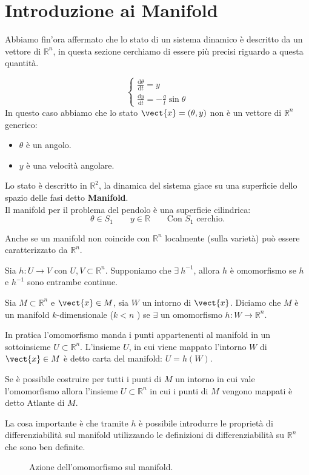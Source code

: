 \section{Introduzione ai Manifold}%
\label{sub:Introduzione ai Manifold}
Abbiamo fin'ora affermato che lo stato di un sistema dinamico è descritto da un vettore di $\mathbb{R}^n$, in questa sezione cerchiamo di essere più precisi riguardo a questa quantità.
\begin{exmp}
    \[
        \begin{cases}
            \frac{\text{d} \theta}{\text{d} t} = y\\
	    \frac{\text{d} y}{\text{d} t} = -\frac{g}{l}\sin\theta
        \end{cases}
    \] 
    In questo caso abbiamo che lo stato $\vect{x} = (\theta, y)$ non è un vettore di $\mathbb{R}^n$ generico: 
    \begin{itemize}
        \item $\theta$ è un angolo. 
	\item $y$ è una velocità angolare.
    \end{itemize}
    Lo stato è descritto in $\mathbb{R}^2$, la dinamica del sistema giace su una superficie dello spazio delle fasi detto \textbf{Manifold}.\\
    Il manifold per il problema del pendolo è una superficie cilindrica:
    \[
        \theta\in S_1 \qquad y \in \mathbb{R}\qquad \text{Con $S_1$ cerchio}
    .\] 
\end{exmp}
\noindent
Anche se un manifold non coincide con $\mathbb{R}^n$ localmente (sulla varietà) può essere caratterizzato da $\mathbb{R}^n$.
\begin{defn}[Omomorfismo]
    Sia $h: U\to V$ con $U, V \subset \mathbb{R}^n$. Supponiamo che $\exists \ h^{-1}$, allora $h$ è omomorfismo se $h$ e $h^{-1}$ sono entrambe continue.
\end{defn}
\noindent
\begin{defn}
    Sia $M\subset \mathbb{R}^n$ e $\vect{x}  \in M$, sia $W$ un intorno di $\vect{x}$. Diciamo che $M$ è un manifold $k$-dimensionale ($k<n$ ) se $\exists$ un omomorfismo $h: W\to \mathbb{R}^n$.
\end{defn}
\noindent
In pratica l'omomorfismo manda i punti appartenenti al manifold in un sottoinsieme $U \subset \mathbb{R}^n$. L'insieme $U$, in cui viene mappato l'intorno $W$ di $\vect{x}\in M$ è detto carta del manifold: $U = h(W)$.\\
\begin{defn}
Se è possibile costruire per tutti i punti di $M$ un intorno in cui vale l'omomorfismo allora l'insieme $U \subset \mathbb{R}^n$ in cui i punti di $M$ vengono mappati è detto Atlante di $M$.
\end{defn}
\noindent
La cosa importante è che tramite $h$ è possibile introdurre le proprietà di differenziabilità sul manifold utilizzando le definizioni di differenziabilità su $\mathbb{R}^n$ che sono ben definite.
\begin{figure}[H]
    \centering
    \caption{\scriptsize Azione dell'omomorfismo sul manifold.}
    \label{fig:3_2}
\end{figure}
